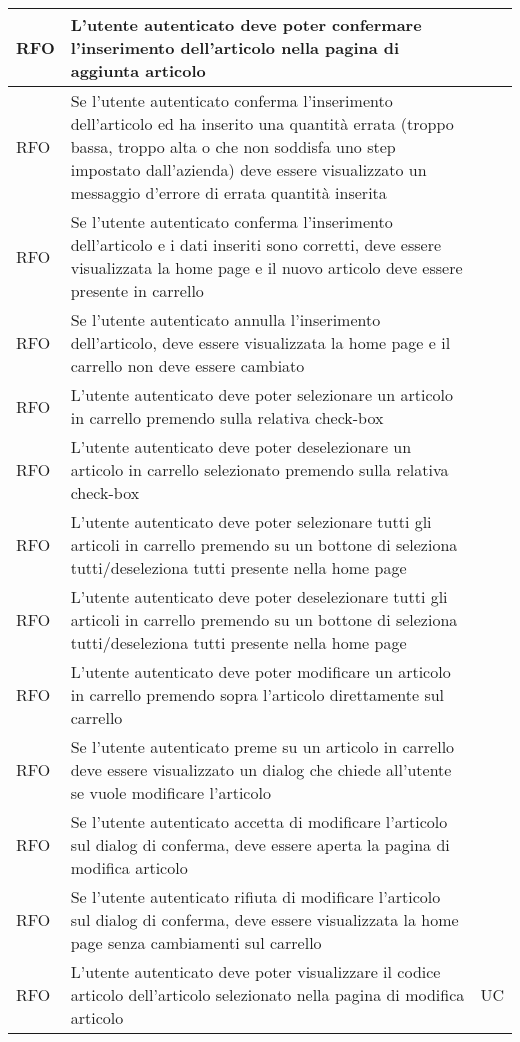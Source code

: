 \begin{center}
\begin{longtable}{ | >{\centering\arraybackslash}m{2.5cm} | >{\centering\arraybackslash}m{8cm} | >{\centering\arraybackslash}m{2.5cm} | }
RFO & L'utente autenticato deve poter confermare l'inserimento dell'articolo nella pagina di aggiunta articolo & \\ \hline
RFO & Se l'utente autenticato conferma l'inserimento dell'articolo ed ha inserito una quantità errata (troppo bassa, troppo alta o che non soddisfa uno step impostato dall'azienda) deve essere visualizzato un messaggio d'errore di errata quantità inserita & \\ \hline
RFO & Se l'utente autenticato conferma l'inserimento dell'articolo e i dati inseriti sono corretti, deve essere visualizzata la home page e il nuovo articolo deve essere presente in carrello & \\ \hline
RFO & Se l'utente autenticato annulla l'inserimento dell'articolo, deve essere visualizzata la home page e il carrello non deve essere cambiato & \\ \hline
RFO & L'utente autenticato deve poter selezionare un articolo in carrello premendo sulla relativa check-box & \\ \hline
RFO & L'utente autenticato deve poter deselezionare un articolo in carrello selezionato premendo sulla relativa check-box & \\ \hline
RFO & L'utente autenticato deve poter selezionare tutti gli articoli in carrello premendo su un bottone di seleziona tutti/deseleziona tutti presente nella home page & \\ \hline
RFO & L'utente autenticato deve poter deselezionare tutti gli articoli in carrello premendo su un bottone di seleziona tutti/deseleziona tutti presente nella home page & \\ \hline
RFO & L'utente autenticato deve poter modificare un articolo in carrello premendo sopra l'articolo direttamente sul carrello & \\ \hline
RFO & Se l'utente autenticato preme su un articolo in carrello deve essere visualizzato un dialog che chiede all'utente se vuole modificare l'articolo & \\ \hline
RFO & Se l'utente autenticato accetta di modificare l'articolo sul dialog di conferma, deve essere aperta la pagina di modifica articolo & \\ \hline
RFO & Se l'utente autenticato rifiuta di modificare l'articolo sul dialog di conferma, deve essere visualizzata la home page senza cambiamenti sul carrello & \\ \hline
RFO & L'utente autenticato deve poter visualizzare il codice articolo dell'articolo selezionato nella pagina di modifica articolo & UC \\ \hline

\end{longtable}
\end{center}
